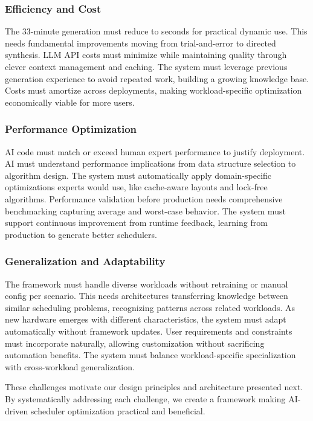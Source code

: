 \subsubsection{Efficiency and Cost}

The 33-minute generation must reduce to seconds for practical dynamic use. This needs fundamental improvements moving from trial-and-error to directed synthesis. LLM API costs must minimize while maintaining quality through clever context management and caching. The system must leverage previous generation experience to avoid repeated work, building a growing knowledge base. Costs must amortize across deployments, making workload-specific optimization economically viable for more users.

\subsubsection{Performance Optimization}

AI code must match or exceed human expert performance to justify deployment. AI must understand performance implications from data structure selection to algorithm design. The system must automatically apply domain-specific optimizations experts would use, like cache-aware layouts and lock-free algorithms. Performance validation before production needs comprehensive benchmarking capturing average and worst-case behavior. The system must support continuous improvement from runtime feedback, learning from production to generate better schedulers.

\subsubsection{Generalization and Adaptability}

The framework must handle diverse workloads without retraining or manual config per scenario. This needs architectures transferring knowledge between similar scheduling problems, recognizing patterns across related workloads. As new hardware emerges with different characteristics, the system must adapt automatically without framework updates. User requirements and constraints must incorporate naturally, allowing customization without sacrificing automation benefits. The system must balance workload-specific specialization with cross-workload generalization.

These challenges motivate our design principles and architecture presented next. By systematically addressing each challenge, we create a framework making AI-driven scheduler optimization practical and beneficial.